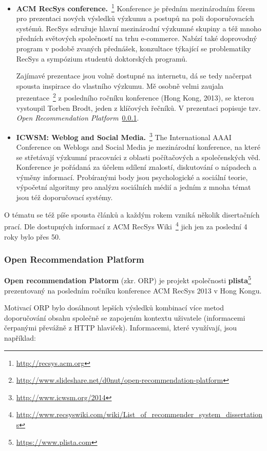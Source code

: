 \documentclass[thesis=M,czech]{FITthesis}[2014/05/07]
\begin{document}
\begin{itemize}
  \item \textbf{ACM RecSys conference.}~\footnote{\url{http://recsys.acm.org}} Konference je předním mezinárodním fórem pro prezentaci nových výsledků výzkumu a postupů na poli doporučovacích systémů. RecSys sdružuje hlavní mezinárodní výzkumné skupiny a též mnoho předních světových společností na trhu e-commerce. Nabízí také doprovodný program v podobě zvaných přednášek, konzultace týkající se problematiky RecSys a sympózium studentů doktorských programů. 
  
  Zajímavé prezentace jsou volně dostupné na internetu, dá se tedy načerpat spousta inspirace do vlastního výzkumu. Mě osobně velmi zaujala prezentace~\footnote{\url{http://www.slideshare.net/d0nut/open-recommendation-platform}} z posledního ročníku konference (Hong Kong, 2013), se kterou vystoupil Torben Brodt, jeden z klíčových řečníků. V prezentaci popisuje tzv. \emph{Open Recommendation Platform}~\ref{sub:orp}. 
  
  \item \textbf{ICWSM: Weblog and Social Media.}~\footnote{\url{http://www.icwsm.org/2014}} The International AAAI Conference on Weblogs and Social Media je mezinárodní konference, na které se střetávají výzkumní pracovníci z oblasti počítačových a společenských věd. Konference je pořádaná za účelem sdílení znalostí, diskutování o nápadech a výměny informací. Probíranými body jsou psychologické a sociální teorie, výpočetní algoritmy pro analýzu sociálních médií a jedním z mnoha témat jsou též doporučovací systémy.
\end{itemize}

O tématu se též píše spousta článků a každým rokem vzniká několik disertačních prací. Dle dostupných informací z ACM RecSys Wiki~\footnote{\url{http://www.recsyswiki.com/wiki/List_of_recommender_system_dissertations}} jich jen za poslední 4 roky bylo přes 50.

\subsubsection{Open Recommendation Platform}
\label{sub:orp}
\textbf{Open recommendation Platorm} (zkr. ORP) je projekt společnosti \textbf{plista}\footnote{\url{https://www.plista.com}} prezentovaný na posledním ročníku konference ACM RecSys 2013 v Hong Kongu. 

Motivací ORP bylo dosáhnout lepších výsledků kombinací více metod doporučování obsahu společně se zapojením kontextu uživatele (informacemi čerpanými převážně z HTTP hlaviček). Informacemi, které využívají, jsou například:
\end{document}
